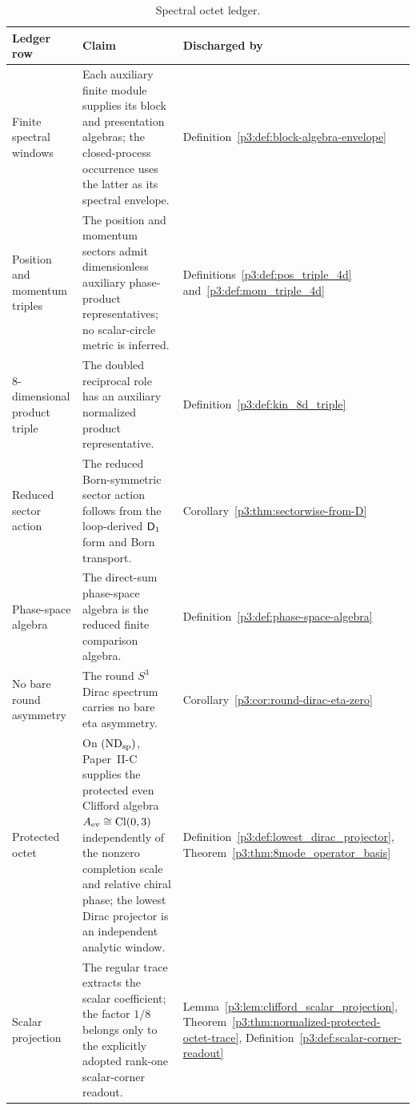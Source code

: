 \documentclass[12pt,a4paper]{article}
\begin{document}
\begin{table}[H]
\centering
\small
\begingroup
\setlength{\tabcolsep}{3pt}
\renewcommand{\arraystretch}{1.15}
\begin{tabular}{@{}
  L{3cm}
  L{9cm}
  L{\dimexpr\linewidth-12cm-4\tabcolsep\relax}
@{}}
\toprule
\textbf{Ledger row}
& \textbf{Claim}
& \textbf{Discharged by} \\
\midrule
Finite spectral windows
& Each auxiliary finite module supplies its block and presentation algebras; the closed-process occurrence uses the latter as its spectral envelope.
& Definition~\ref{p3:def:block-algebra-envelope} \\

Position and momentum triples
& The position and momentum sectors admit dimensionless auxiliary phase-product representatives; no scalar-circle metric is inferred.
& Definitions~\ref{p3:def:pos_triple_4d} and~\ref{p3:def:mom_triple_4d} \\

8-dimensional product triple
& The doubled reciprocal role has an auxiliary normalized product representative.
& Definition~\ref{p3:def:kin_8d_triple} \\

Reduced sector action
& The reduced Born-symmetric sector action follows from the loop-derived \(\mathsf{D}_1\) form and Born transport.
& Corollary~\ref{p3:thm:sectorwise-from-D} \\

Phase-space algebra
& The direct-sum phase-space algebra is the reduced finite comparison algebra.
& Definition~\ref{p3:def:phase-space-algebra} \\

No bare round asymmetry
& The round \(S^3\) Dirac spectrum carries no bare eta asymmetry.
& Corollary~\ref{p3:cor:round-dirac-eta-zero} \\

Protected octet
& On \((\mathrm{ND}_{\rm sp})\), Paper~II-C supplies the protected even Clifford algebra \(A_{\rm ev}\cong\operatorname{Cl}(0,3)\) independently of the nonzero completion scale and relative chiral phase; the lowest Dirac projector is an independent analytic window.
& Definition~\ref{p3:def:lowest_dirac_projector}, Theorem~\ref{p3:thm:8mode_operator_basis} \\

Scalar projection
& The regular trace extracts the scalar coefficient; the factor \(1/8\)
belongs only to the explicitly adopted rank-one scalar-corner readout.
& Lemma~\ref{p3:lem:clifford_scalar_projection},
Theorem~\ref{p3:thm:normalized-protected-octet-trace},
Definition~\ref{p3:def:scalar-corner-readout} \\

\bottomrule
\end{tabular}
\caption[Spectral octet ledger]{Spectral octet ledger.}
\label{tab:p3-spectral-octet-ledger}
\endgroup
\end{table}
\end{document}

